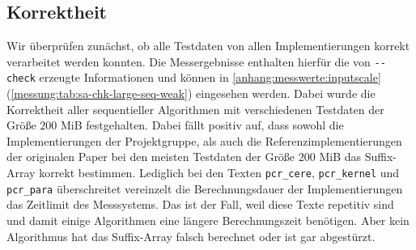 \subsection{\sa Korrektheit}

Wir überprüfen zunächst, ob alle Testdaten von allen Implementierungen korrekt verarbeitet werden konnten. Die Messergebnisse enthalten hierfür die von \texttt{-{}-check} erzeugte Informationen und können in \cref{anhang:messwerte:inputscale} (\cref{messung:tab:sa-chk-large-seq-weak}) eingesehen werden. Dabei wurde die Korrektheit aller sequentieller Algorithmen mit verschiedenen Testdaten der Größe $200$ MiB festgehalten. Dabei fällt positiv auf, dass sowohl die Implementierungen der Projektgruppe, als auch die Referenzimplementierungen der originalen Paper bei den meisten Testdaten der Größe $200$ MiB das Suffix-Array korrekt bestimmen. Lediglich bei den Texten \texttt{pcr\_cere}, \texttt{pcr\_kernel} und \texttt{pcr\_para} überschreitet vereinzelt die Berechnungsdauer der Implementierungen das Zeitlimit des Messsystems. Das ist der Fall, weil diese Texte repetitiv sind und damit einige Algorithmen eine längere Berechnungszeit benötigen. Aber kein Algorithmus hat das Suffix-Array falsch berechnet oder ist gar abgestürzt.